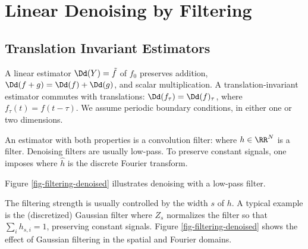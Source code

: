\section{Linear Denoising by Filtering}
\label{sec-linear-denoising}

                                                     
\subsection{Translation Invariant Estimators}

A linear estimator $\Dd(Y) = \tilde f$ of $f_0$ preserves addition, $\Dd(f+g) = \Dd(f)+\Dd(g)$, and scalar multiplication.
A translation-invariant estimator commutes with translations: $\Dd(f_\tau) = \Dd(f)_\tau$, where $f_\tau(t) = f(t-\tau)$. We assume periodic boundary conditions, in either one or two dimensions.
 
An estimator with both properties is a convolution filter:
where $h\in\RR^N$ is a filter. Denoising filters are usually low-pass. To preserve constant signals, one imposes
where $\hat h$ is the discrete Fourier transform. 

Figure \ref{fig-filtering-denoised} illustrates denoising with a low-pass filter.


The filtering strength is usually controlled by the width $s$ of $h$. A typical example is the (discretized) Gaussian filter
where $Z_s$ normalizes the filter so that $\sum_i h_{s,i}=1$, preserving constant signals. Figure \ref{fig-filtering-denoised} shows the effect of Gaussian filtering in the spatial and Fourier domains.

